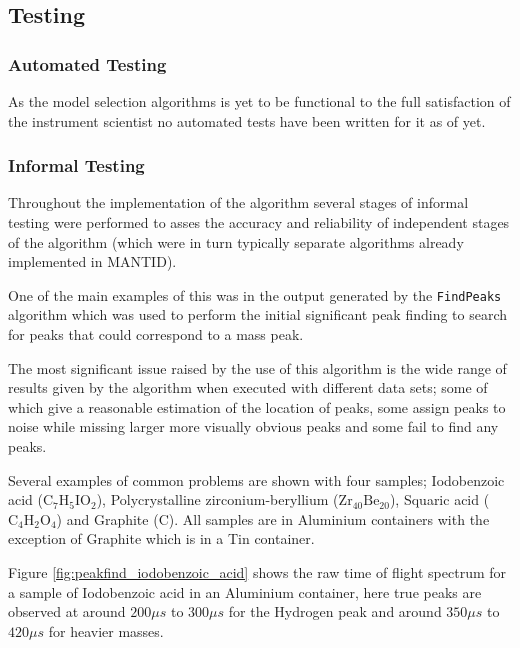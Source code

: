 \documentclass[a4paper]{article}
\newcommand{\chem}[1]{$\mathrm{#1}$}
\begin{document}
\subsection{Testing}
\label{sec:bayes_testing}

\subsubsection{Automated Testing}

As the model selection algorithms is yet to be functional to the full
satisfaction of the instrument scientist no automated tests have been written
for it as of yet.

\subsubsection{Informal Testing}
\label{sec:bayes_informal_testing}

Throughout the implementation of the algorithm several stages of informal
testing were performed to asses the accuracy and reliability of independent
stages of the algorithm (which were in turn typically separate algorithms
already implemented in \gls*{MANTID}).

One of the main examples of this was in the output generated by the
\texttt{FindPeaks} algorithm which was used to perform the initial significant
peak finding to search for peaks that could correspond to a mass peak.

The most significant issue raised by the use of this algorithm is the wide range
of results given by the algorithm when executed with different data sets; some
of which give a reasonable estimation of the location of peaks, some assign
peaks to noise while missing larger more visually obvious peaks and some fail to
find any peaks.

Several examples of common problems are shown with four samples; Iodobenzoic
acid (\chem{C_{7}H_{5}IO_{2}}), Polycrystalline zirconium-beryllium
(\chem{Zr_{40}Be_{20}}), Squaric acid (\chem{C_{4}H_{2}O_{4}}) and Graphite
(\chem{C}). All samples are in Aluminium containers with the exception of
Graphite which is in a Tin container.

Figure \ref{fig:peakfind_iodobenzoic_acid} shows the raw time of flight spectrum
for a sample of Iodobenzoic acid in an Aluminium container, here true peaks are
observed at around $200 \mu s$ to $300 \mu s$ for the Hydrogen peak and around
$350 \mu s$ to $420 \mu s$ for heavier masses.
\end{document}
